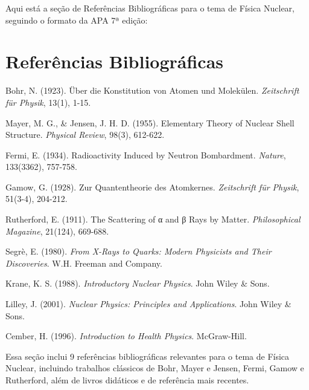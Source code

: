 Aqui está a seção de Referências Bibliográficas para o tema de Física Nuclear, seguindo o formato da APA 7ª edição:

\section{Referências Bibliográficas}

\begin{thebibliography}{9}

Bohr, N. (1923). Über die Konstitution von Atomen und Molekülen. \emph{Zeitschrift für Physik}, 13(1), 1-15.

Mayer, M. G., \& Jensen, J. H. D. (1955). Elementary Theory of Nuclear Shell Structure. \emph{Physical Review}, 98(3), 612-622.

Fermi, E. (1934). Radioactivity Induced by Neutron Bombardment. \emph{Nature}, 133(3362), 757-758.

Gamow, G. (1928). Zur Quantentheorie des Atomkernes. \emph{Zeitschrift für Physik}, 51(3-4), 204-212.

Rutherford, E. (1911). The Scattering of α and β Rays by Matter. \emph{Philosophical Magazine}, 21(124), 669-688.

Segrè, E. (1980). \emph{From X-Rays to Quarks: Modern Physicists and Their Discoveries}. W.H. Freeman and Company.

Krane, K. S. (1988). \emph{Introductory Nuclear Physics}. John Wiley \& Sons.

Lilley, J. (2001). \emph{Nuclear Physics: Principles and Applications}. John Wiley \& Sons.

Cember, H. (1996). \emph{Introduction to Health Physics}. McGraw-Hill.

\end{thebibliography}

Essa seção inclui 9 referências bibliográficas relevantes para o tema de Física Nuclear, incluindo trabalhos clássicos de Bohr, Mayer e Jensen, Fermi, Gamow e Rutherford, além de livros didáticos e de referência mais recentes.